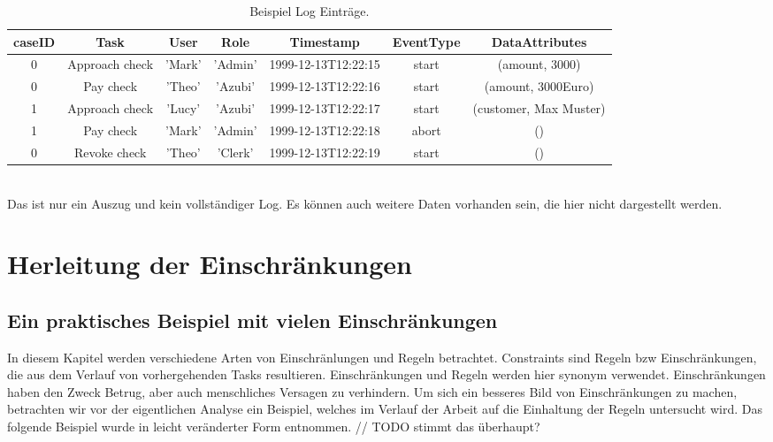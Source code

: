 \begin{table}[h!]
\footnotesize
  \centering
  \begin{tabular}{|c|c|c|c|c|c|c|}
  \hline
  caseID & Task & User & Role & Timestamp & EventType & DataAttributes\\
  \hline
  0 & Approach check &'Mark' &'Admin' &1999-12-13T12:22:15 & start&(amount, 3000)\\
  0 & Pay check & 'Theo' &'Azubi' &1999-12-13T12:22:16 & start&(amount, 3000Euro)\\
  1 & Approach check &'Lucy' & 'Azubi' &1999-12-13T12:22:17 &start&(customer, Max Muster)\\
  1 & Pay check &'Mark' & 'Admin' &1999-12-13T12:22:18 & abort&()\\
  0 & Revoke check & 'Theo' & 'Clerk' & 1999-12-13T12:22:19 & start&()\\
  \hline
  \end{tabular}
\\
Das ist nur ein Auszug und kein vollständiger Log. Es können auch weitere Daten vorhanden sein, die hier nicht dargestellt werden.
  \caption{Beispiel Log Einträge. }
  \label{tab:examplelog}
\end{table}

\section{Herleitung der Einschränkungen}



\subsection{Ein praktisches Beispiel mit vielen Einschränkungen}
\label{sec:exampleconstraints}

In diesem Kapitel werden verschiedene Arten von Einschränlungen und Regeln betrachtet.
Constraints sind Regeln bzw Einschränkungen, die aus dem Verlauf von vorhergehenden Tasks resultieren. Einschränkungen und Regeln werden hier synonym verwendet.
Einschränkungen haben den Zweck Betrug, aber auch menschliches Versagen zu verhindern.
Um sich ein besseres Bild von Einschränkungen zu machen, betrachten wir vor der eigentlichen Analyse ein Beispiel, welches im Verlauf der Arbeit auf die Einhaltung der Regeln untersucht wird.
Das folgende Beispiel wurde in leicht veränderter Form \cite{wolter_modeling_of_TBAC_in_BPMN} entnommen. // TODO stimmt das überhaupt?

